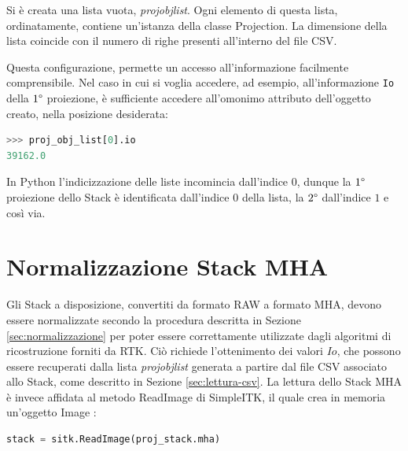 \documentclass[a4paper,12pt, doubleside]{report}
\begin{document}
                Si è creata una lista vuota, \textit{proj\textunderscore obj\textunderscore list}. Ogni elemento di questa lista, ordinatamente, contiene un'istanza della classe Projection. La dimensione della lista coincide con il numero di righe presenti all'interno del file CSV.
            
            \bigskip
            \par
                Questa configurazione, permette un accesso all'informazione facilmente comprensibile. Nel caso in cui si voglia accedere, ad esempio, all'informazione \texttt{Io} della $1\degree$ proiezione, è sufficiente accedere all'omonimo attributo dell'oggetto creato, nella posizione desiderata: 
            
                \begin{lstlisting}[language=python, frame=bt]
>>> proj_obj_list[0].io
39162.0
                \end{lstlisting}
            
               In Python l'indicizzazione delle liste incomincia dall'indice $0$, dunque la $1\degree$ proiezione dello Stack è identificata dall'indice $0$ della lista, la $2\degree$ dall'indice $1$ e così via.
        
        \section{Normalizzazione Stack MHA}
            \label{sec:norm-disp}
            
            \par
                Gli Stack a disposizione, convertiti da formato RAW a formato MHA, devono essere normalizzate secondo la procedura descritta in Sezione \ref{sec:normalizzazione} per poter essere correttamente utilizzate dagli algoritmi di ricostruzione forniti da RTK. Ciò richiede l'ottenimento dei valori $Io$, che possono essere recuperati dalla lista \textit{proj\textunderscore obj\textunderscore list} generata a partire dal file CSV associato allo Stack, come descritto in Sezione \ref{sec:lettura-csv}. La lettura dello Stack MHA è invece affidata al metodo ReadImage di SimpleITK, il quale crea in memoria un'oggetto Image \cite{sitk-image}:
                
                \begin{lstlisting}[language=python, frame=bt]
stack = sitk.ReadImage(proj_stack.mha)
                \end{lstlisting}
                
\end{document}
